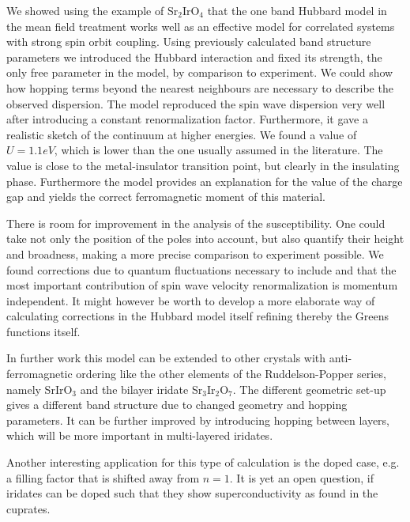 We showed using the example of Sr$_2$IrO$_4$ that the one band Hubbard model in the mean field treatment works well as an effective model
for correlated systems with strong spin orbit coupling. 
Using previously calculated band structure parameters we introduced the Hubbard interaction and fixed its strength, the only free parameter in the model, by comparison to experiment. 
We could show how hopping terms beyond the nearest neighbours are necessary to describe the observed dispersion. 
The model reproduced the spin wave dispersion very well after introducing a constant renormalization factor. 
Furthermore, it gave a realistic sketch of the continuum at higher energies.
We found a value of $U=1.1eV$, which is lower than the one usually assumed in the literature.
The value is close to the metal-insulator transition point, but clearly in the insulating phase.
Furthermore the model provides an explanation for the value of the charge gap and yields the correct ferromagnetic moment of this material.


There is room for improvement in the analysis of the susceptibility. 
One could take not only the position of the poles into account, but also quantify their height and broadness, making a more precise comparison to experiment possible. 
We found corrections due to quantum fluctuations necessary to include and that the most important contribution of spin wave velocity renormalization is momentum independent. 
It might however be worth to develop a more elaborate way of calculating corrections in the Hubbard model itself refining thereby the Greens functions itself. 

In further work this model can be extended to other crystals with anti-ferromagnetic ordering
like the other elements of the Ruddelson-Popper series, namely SrIrO$_3$ and the bilayer iridate Sr$_3$Ir$_2$O$_7$.
The different geometric set-up gives a different band structure due to changed geometry and hopping parameters. 
It can be further improved by introducing hopping between layers, which will be more important in multi-layered iridates. 

Another interesting application for this type of calculation is the doped case, e.g. a filling factor that is shifted away from $n=1$. 
It is yet an open question, if iridates can be doped such that they show superconductivity as found in the cuprates.






